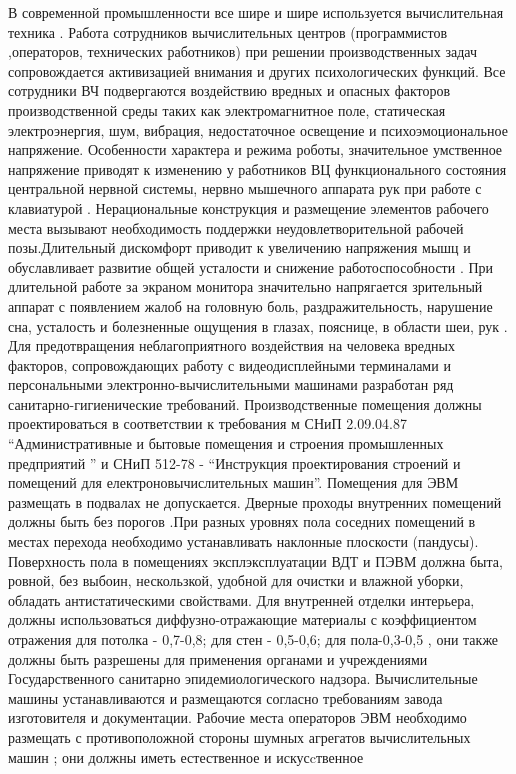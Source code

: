 В современной промышленности все шире и шире используется вычислительная техника . Работа сотрудников вычислительных
центров (программистов ,операторов, технических работников) при решении производственных задач сопровождается
активизацией внимания и других психологических функций. Все сотрудники ВЧ подвергаются воздействию вредных и
опасных факторов производственной среды таких как электромагнитное поле, статическая электроэнергия, шум, вибрация,
недостаточное освещение и психоэмоциональное напряжение. Особенности характера и режима роботы, значительное
умственное напряжение приводят к изменению у работников ВЦ функционального состояния центральной нервной системы,
нервно мышечного аппарата рук при работе с клавиатурой . Нерациональные конструкция и размещение элементов рабочего
места вызывают необходимость поддержки неудовлетворительной рабочей позы.Длительный дискомфорт приводит к увеличению
напряжения мышц и обуславливает развитие общей усталости и снижение работоспособности . При длительной работе за
экраном монитора значительно напрягается зрительный аппарат с появлением жалоб на головную боль, раздражительность,
нарушение сна, усталость и болезненные ощущения в глазах, пояснице, в области шеи, рук . Для предотвращения
неблагоприятного воздействия на человека вредных факторов, сопровождающих работу с видеодисплейными терминалами
и персональными электронно-вычислительными машинами разработан ряд санитарно-гигиенические требований.
Производственные помещения должны проектироваться в соответствии к требования м СНиП 2.09.04.87
“Административные и бытовые помещения и строения промышленных предприятий ” и СНиП 512-78 - “Инструкция проектирования
строений и помещений для електроновычислительных машин”. Помещения для ЭВМ размещать в подвалах не допускается.
Дверные проходы внутренних помещений должны быть без порогов .При разных уровнях пола соседних помещений в местах
перехода необходимо устанавливать наклонные плоскости (пандусы). Поверхность пола в помещениях эксплэксплуатации ВДТ
и ПЭВМ должна быта, ровной, без выбоин, нескользкой, удобной для очистки и влажной уборки, обладать антистатическими
свойствами. Для внутренней отделки интерьера, должны использоваться диффузно-отражающие материалы с коэффициентом
отражения для потолка - 0,7-0,8; для стен - 0,5-0,6; для пола-0,3-0,5 , они также должны быть разрешены для применения
органами и учреждениями Государственного санитарно эпидемиологического надзора. Вычислительные машины устанавливаются
и размещаются согласно требованиям завода изготовителя и документации. Рабочие места операторов ЭВМ необходимо
размещать с противоположной стороны шумных агрегатов вычислительных машин ; они должны иметь естественное и искусcтвенное
